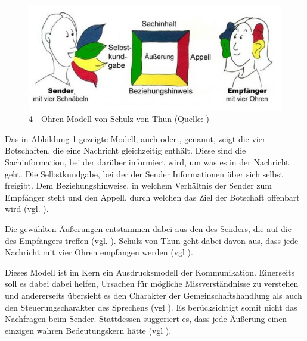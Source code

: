 \begin{figure}[ht]
\centering
\includegraphics[width=1\linewidth]{content/pictures/Kommunikationsquadrat.PNG}
\caption{4 - Ohren Modell von Schulz von Thun (Quelle: \cite{noauthor_kommunikationsquadrat_nodate})}
\label{fig:four-ears}
\end{figure}

Das in Abbildung \ref{fig:four-ears} gezeigte Modell, auch  oder , genannt, zeigt die vier Botschaften, die eine Nachricht gleichzeitig enthält. Diese sind die Sachinformation, bei der darüber informiert wird, um was es in der Nachricht geht. Die Selbstkundgabe, bei der der Sender Informationen über sich selbst freigibt. Dem Beziehungshinweise, in welchem Verhältnis der Sender zum Empfänger steht und den Appell, durch welchen das Ziel der Botschaft offenbart wird (vgl. \cite{noauthor_kommunikationsquadrat_nodate}).

Die gewählten Äußerungen entstammen dabei aus den  des Senders, die auf die  des Empfängers treffen (vgl. \cite{noauthor_kommunikationsquadrat_nodate}). Schulz von Thun geht dabei davon aus, dass jede Nachricht mit vier Ohren empfangen werden (vgl \cite[S. 23]{becker_praxishandbuch_2018}). 

Dieses Modell ist im Kern ein Ausdrucksmodell der Kommunikation. Einerseits soll es dabei dabei helfen, Ursachen für mögliche Missverständnisse zu verstehen und andererseits übersieht es den Charakter der Gemeinschaftshandlung als auch den Steuerungscharakter des Sprechens (vgl \cite[S. 23]{becker_praxishandbuch_2018}). Es berücksichtigt somit nicht das Nachfragen beim Sender. Stattdessen suggeriert es, dass jede Äußerung einen einzigen wahren Bedeutungskern hätte (vgl \cite[S. 23]{becker_praxishandbuch_2018}). 

